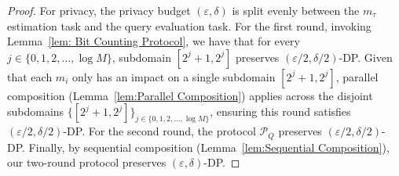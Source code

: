 \begin{proof}
    For privacy, the privacy budget $(\varepsilon, \delta)$ is split evenly between the $m_\tau$ estimation task and the query evaluation task. 
For the first round, invoking Lemma~\ref{lem: Bit Counting Protocol}, we have that for every $j \in \{0,1,2,\dots,\log M\}$, subdomain $[2^j+1,2^j]$ preserves $(\varepsilon/2,\delta/2)$-DP. Given that each $m_i$ only has an impact on a single subdomain $[2^j+1,2^j]$, 
parallel composition (Lemma~\ref{lem:Parallel Composition}) applies across the disjoint subdomains $\{[2^j+1,2^j]\}_{j\in\{0,1,2,\dots,\log M\}}$, ensuring this round satisfies $(\varepsilon/2,\delta/2)$-DP.
For the second round, the protocol $\mathcal{P}_Q$ preserves $(\varepsilon/2,\delta/2)$-DP. Finally, by sequential composition (Lemma~\ref{lem:Sequential Composition}), our two-round protocol preserves $(\varepsilon,\delta)$-DP.


\end{proof}
